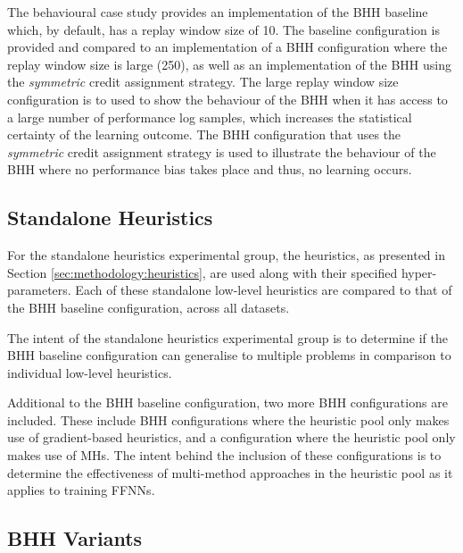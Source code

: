 The behavioural case study provides an implementation of the \acs{BHH} baseline which, by default, has a replay window size of 10. The baseline configuration is provided and compared to an implementation of a \acs{BHH} configuration where the replay window size is large (250), as well as an implementation of the \acs{BHH} using the \textit{symmetric} credit assignment strategy. The large replay window size configuration is to used to show the behaviour of the \acs{BHH} when it has access to a large number of performance log samples, which increases the statistical certainty of the learning outcome. The \acs{BHH} configuration that uses the \textit{symmetric} credit assignment strategy is used to illustrate the behaviour of the \acs{BHH} where no performance bias takes place and thus, no learning occurs.

\subsection{Standalone Heuristics}
\label{sec:methodology:experiments:standalone_optimisers}

For the standalone heuristics experimental group, the heuristics, as presented in Section \ref{sec:methodology:heuristics}, are used along with their specified hyper-parameters. Each of these standalone low-level heuristics are compared to that of the \acs{BHH} baseline configuration, across all datasets.

The intent of the standalone heuristics experimental group is to determine if the \acs{BHH} baseline configuration can generalise to multiple problems in comparison to individual low-level heuristics.

Additional to the \acs{BHH} baseline configuration, two more \acs{BHH} configurations are included. These include \acs{BHH} configurations where the heuristic pool only makes use of gradient-based heuristics, and a configuration where the heuristic pool only makes use of \acp{MH}. The intent behind the inclusion of these configurations is to determine the effectiveness of multi-method approaches in the heuristic pool as it applies to training \acp{FFNN}.

\subsection{BHH Variants}
\label{sec:methodology:experiments:bhh_variants}

